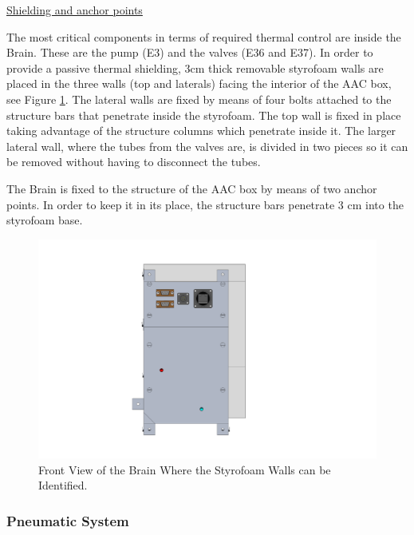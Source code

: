 



\pagebreak
\underline{Shielding and anchor points}

The most critical components in terms of required thermal control are inside the Brain. These are the pump (E3) and the valves (E36 and E37). In order to provide a passive thermal shielding, 3cm thick removable styrofoam walls are placed in the three walls (top and laterals) facing the interior of the AAC box, see Figure \ref{brain_front}. The lateral walls are fixed by means of four bolts attached to the structure bars that penetrate inside the styrofoam. The top wall is fixed in place taking advantage of the structure columns which penetrate inside it. The larger lateral wall, where the tubes from the valves are, is divided in two pieces so it can be removed without having to disconnect the tubes. 

\smallskip
The Brain is fixed to the structure of the AAC box by means of two anchor points. In order to keep it in its place, the structure bars penetrate 3 cm into the styrofoam base.

\begin{figure}[H]
    \centering
    \includegraphics[width=1\textwidth]{4-experiment-design/img/Mechanical/Panel_Front.png}
    \caption{Front View of the Brain Where the Styrofoam Walls can be Identified.}
    \label{brain_front}
\end{figure}


\pagebreak
\subsubsection{Pneumatic System}
\label{sec:4.4.5}

